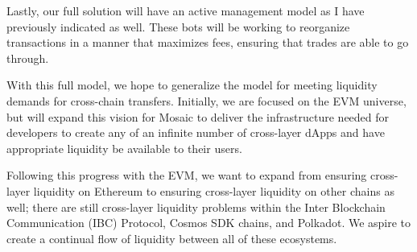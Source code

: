 Lastly, our full solution will have an active management model as I have previously indicated as well. These bots will be working to reorganize transactions in a manner that maximizes fees, ensuring that trades are able to go through.

With this full model, we hope to generalize the model for meeting liquidity demands for cross-chain transfers. Initially, we are focused on the EVM universe, but will expand this vision for Mosaic to deliver the infrastructure needed for developers to create any of an infinite number of cross-layer dApps and have appropriate liquidity be available to their users.

Following this progress with the EVM, we want to expand from ensuring cross-layer liquidity on Ethereum to ensuring cross-layer liquidity on other chains as well; there are still cross-layer liquidity problems within the Inter Blockchain Communication (IBC) Protocol, Cosmos SDK chains, and Polkadot. We aspire to create a continual flow of liquidity between all of these ecosystems.